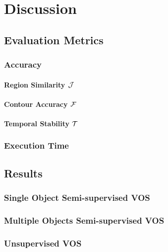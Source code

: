 \section{Discussion}

\subsection{Evaluation Metrics}

\subsubsection{Accuracy}

\paragraph{Region Similarity $\mathcal{J}$}

\paragraph{Contour Accuracy $\mathcal{F}$}

\paragraph{Temporal Stability $\mathcal{T}$}

\subsubsection{Execution Time}

\subsection{Results}


\subsubsection{Single Object Semi-supervised VOS}

\subsubsection{Multiple Objects Semi-supervised VOS}

\subsubsection{Unsupervised VOS}

